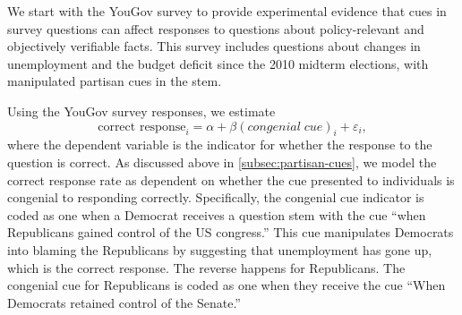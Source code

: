 \documentclass[12pt, letterpaper]{article}
\begin{document}
We start with the YouGov survey to provide experimental evidence that cues in survey questions can affect responses to questions about policy-relevant and objectively verifiable facts. This survey includes questions about changes in unemployment and the budget deficit since the 2010 midterm elections, with manipulated partisan cues in the stem. 

Using the YouGov survey responses, we estimate
\begin{equation}\label{eq:pgap-yougov}
\text{correct response}_{i} = \alpha + \beta (congenial \; cue)_i  +\varepsilon_{i},
\end{equation}
where the dependent variable is the indicator for whether the response to the question is correct.
As discussed above in \cref{subsec:partisan-cues}, we model the correct response rate as dependent on whether the cue presented to individuals is congenial to responding correctly.
Specifically, the congenial cue indicator is coded as one when a Democrat receives a question stem with the cue ``when Republicans gained control of the US congress.'' This cue manipulates Democrats into blaming the Republicans by suggesting that unemployment has gone up, which is the correct response.
The reverse happens for Republicans. The congenial cue for Republicans is coded as one when they receive the cue ``When Democrats retained control of the Senate.''
\end{document}
